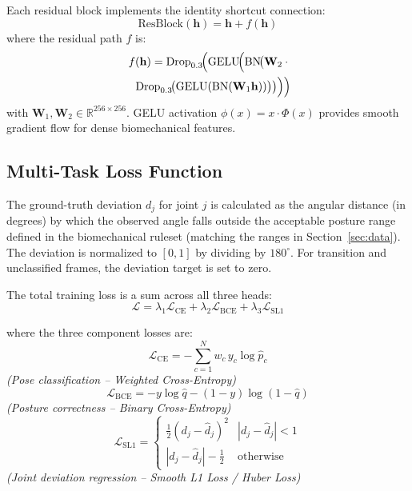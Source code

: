 \documentclass[conference]{IEEEtran}
\begin{document}
Each residual block implements the identity shortcut connection:
\begin{equation}
\text{ResBlock}(\mathbf{h}) = \mathbf{h} + f(\mathbf{h})
\label{eq:resblock}
\end{equation}
\noindent where the residual path $f$ is:
\begin{equation}
\begin{split}
f(\mathbf{h}) = \mathrm{Drop}_{0.3}\!\Bigl(\mathrm{GELU}\!\Bigl(\mathrm{BN}\!\bigl(
\mathbf{W}_2 \cdot {}\\
\quad\mathrm{Drop}_{0.3}\!\bigl(\mathrm{GELU}(\mathrm{BN}(\mathbf{W}_1\mathbf{h}))\bigr)
\bigr)\Bigr)\Bigr)
\end{split}
\end{equation}
\noindent with $\mathbf{W}_1, \mathbf{W}_2 \in \mathbb{R}^{256\times256}$. GELU activation
$\phi(x) = x \cdot \Phi(x)$ provides smooth gradient flow for dense biomechanical features.

\subsection{Multi-Task Loss Function}

The ground-truth deviation $d_j$ for joint $j$ is calculated as the angular distance (in degrees) by which the observed angle falls outside the acceptable posture range defined in the biomechanical ruleset (matching the ranges in Section~\ref{sec:data}). The deviation is normalized to $[0, 1]$ by dividing by $180^\circ$. For transition and unclassified frames, the deviation target is set to zero.

The total training loss is a sum across all three heads:
\begin{equation}
\mathcal{L} = \lambda_1 \mathcal{L}_{\mathrm{CE}} + \lambda_2 \mathcal{L}_{\mathrm{BCE}}
+ \lambda_3 \mathcal{L}_{\mathrm{SL1}}
\label{eq:loss}
\end{equation}

\noindent where the three component losses are:
\begin{equation}
\mathcal{L}_{\mathrm{CE}} = -\sum_{c=1}^{N} w_c\, y_c \log \hat{p}_c
\label{eq:ce}
\end{equation}
\vspace{-4pt}
\noindent\textit{\small (Pose classification -- Weighted Cross-Entropy)}
\begin{equation}
\mathcal{L}_{\mathrm{BCE}} = -y\log\hat{q} - (1-y)\log(1-\hat{q})
\label{eq:bce}
\end{equation}
\vspace{-4pt}
\noindent\textit{\small (Posture correctness -- Binary Cross-Entropy)}
\begin{equation}
\mathcal{L}_{\mathrm{SL1}} =
\begin{cases}
\frac{1}{2}(d_j-\hat{d}_j)^2 & |d_j-\hat{d}_j|<1 \\
|d_j-\hat{d}_j| - \tfrac{1}{2} & \text{otherwise}
\end{cases}
\label{eq:sl1}
\end{equation}
\vspace{-4pt}
\noindent\textit{\small (Joint deviation regression -- Smooth L1 Loss / Huber Loss)}
\end{document}
